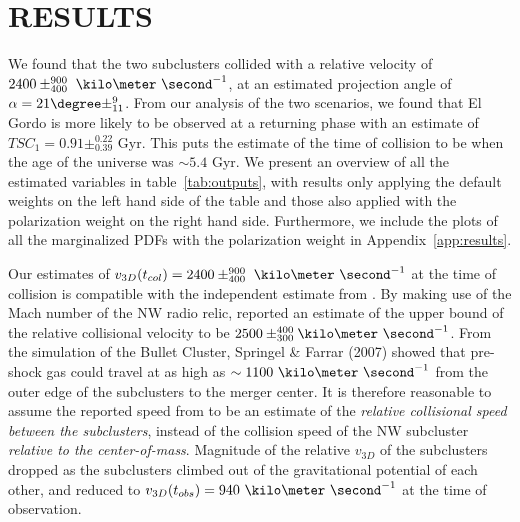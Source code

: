 \section{RESULTS} 
We found that the two subclusters collided with a relative velocity of $2400\pm^{900}_{400}~\kilo\meter~\second^{-1}$, at an estimated projection
angle of $\alpha = 21\degree\pm^{9}_{11}$. From our analysis of the two
scenarios, we found that El Gordo is more likely to be observed at a returning
phase with an estimate of $TSC_1 = 0.91\pm^{0.22}_{0.39}$ Gyr. This puts the
estimate of the time of collision to be when the age of the universe was
$\sim5.4$ Gyr. We present an
overview of all the estimated variables in table~\ref{tab:outputs}, with
results only applying the default weights on the left hand side of the table
and those also applied with the polarization weight on the right hand side.
Furthermore, we include the plots of all the marginalized PDFs with the
polarization weight in Appendix~\ref{app:results}. \par 
Our estimates of $v_{3D}(t_{col}) = 2400\pm^{900}_{400}~\kilo\meter~\second^{-1}$ 
at the time of collision is compatible with the independent estimate from \citealt{L13}. 
By making use of the Mach number of the NW radio relic, \cite{L13}
reported an estimate of the upper bound of the relative collisional
velocity to be $2500
\pm^{400}_{300}\kilo\meter~\second^{-1}$. 
From the simulation of the Bullet Cluster, Springel \& Farrar (2007) showed
that pre-shock gas could travel at as high as $\sim
1100~\kilo\meter~\second^{-1}$ from the outer edge of the subclusters to
the merger center.  It is therefore reasonable to assume the reported speed
from \cite{L13} to be an estimate of the {\it relative collisional speed
between the subclusters}, instead of the collision speed of the NW
subcluster {\it relative to the center-of-mass}.
Magnitude of the relative $v_{3D}$ of the subclusters dropped as the
subclusters climbed out of the gravitational potential of each other, and
reduced to $v_{3D}(t_{obs}) = 940~\kilo\meter~\second^{-1}$ at
the time of observation.\par 

